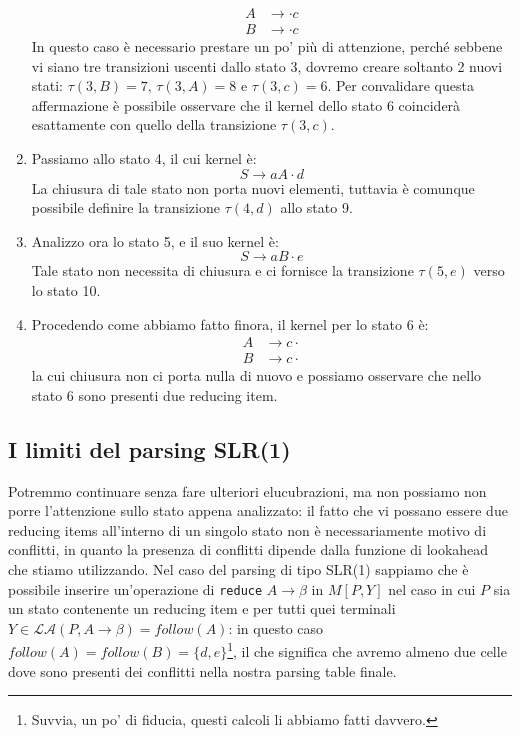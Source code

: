 \documentclass[class=book, crop=false, oneside, 12pt]{standalone}
\begin{document}
\begin{enumerate}
    \begin{align*}
        A &\to \cdot c \\
        B &\to \cdot c
    \end{align*}
    In questo caso è necessario prestare un po' più di attenzione, perché sebbene vi siano tre transizioni uscenti dallo stato 3, dovremo creare soltanto 2 nuovi stati: \(\tau(3,B)=7 \textrm{, } \tau(3,A)=8 \textrm{ e } \tau(3,c)=6\). Per convalidare questa affermazione è possibile osservare che il kernel dello stato 6 coinciderà esattamente con quello della transizione \(\tau(3, c)\).
    \item Passiamo allo stato 4, il cui kernel è:
    \begin{equation*}
        S \to aA \cdot d 
    \end{equation*}
   La chiusura di tale stato non porta nuovi elementi, tuttavia è comunque possibile definire la transizione \(\tau(4,d)\) allo stato 9.
    \item Analizzo ora lo stato 5, e il suo kernel è:
    \begin{equation*}
        S \to aB \cdot e
    \end{equation*}
    Tale stato non necessita di chiusura e ci fornisce la transizione \(\tau(5,e)\) verso lo stato 10.
    \item Procedendo come abbiamo fatto finora, il kernel per lo stato 6 è:
    \begin{align*}
        A &\to c \cdot \\
        B &\to c \cdot
    \end{align*}
    la cui chiusura non ci porta nulla di nuovo e possiamo osservare che nello stato 6 sono presenti due reducing item.
\end{enumerate}

\subsection{I limiti del parsing SLR(1)}
Potremmo continuare senza fare ulteriori elucubrazioni, ma non possiamo non porre l'attenzione sullo stato appena analizzato: il fatto che vi possano essere due reducing items all'interno di un singolo stato non è necessariamente motivo di conflitti, in quanto la presenza di conflitti dipende dalla funzione di lookahead che stiamo utilizzando. Nel caso del parsing di tipo SLR(1) sappiamo che è possibile inserire un'operazione di \texttt{reduce} \(A \rightarrow \beta\) in \(M[P, Y]\) nel caso in cui \(P\) sia un stato contenente un reducing item e per tutti quei terminali \(Y \in \mathcal{LA}(P, A \rightarrow \beta) = follow(A)\): in questo caso \(follow(A) = follow(B) = \{d, e\}\)\footnote{Suvvia, un po' di fiducia, questi calcoli li abbiamo fatti davvero.}, il che significa che avremo almeno due celle dove sono presenti dei conflitti nella nostra parsing table finale.
\end{document}
